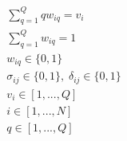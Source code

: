 \begin{subequations}
\begin{align}
        \sum_{q=1}^Q qw_{iq} = v_i                                              \label{subeq:wmax}           \\
        \sum_{q=1}^Q w_{iq} = 1                                                 \label{subeq:wone}           \\
        w_{iq} \in \{0,1\}                                                      \label{subeq:wspace}         \\
        \sigma_{ij} \in \{0,1\},\;\delta_{ij} \in \{0,1\}\;                     \label{subeq:ssdspace}        \\
        v_i \in  [1,...,Q ]                                                     \label{subeq:vvspace}        \\
        i \in [1,...,N]                                                        \label{subeq:vispace}         \\
        q \in [1,...,Q] 							   \label{subeq:qspace}
    \end{align}
    \end{subequations}    